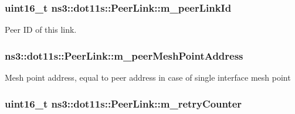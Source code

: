 \subsubsection[{\texorpdfstring{m\+\_\+peer\+Link\+Id}{m_peerLinkId}}]{\setlength{\rightskip}{0pt plus 5cm}uint16\+\_\+t ns3\+::dot11s\+::\+Peer\+Link\+::m\+\_\+peer\+Link\+Id\hspace{0.3cm}{\ttfamily [private]}}\hypertarget{classns3_1_1dot11s_1_1PeerLink_af620e2d2607904bc9b5d107aa1524038}{}\label{classns3_1_1dot11s_1_1PeerLink_af620e2d2607904bc9b5d107aa1524038}


Peer ID of this link. 

\subsubsection[{\texorpdfstring{m\+\_\+peer\+Mesh\+Point\+Address}{m_peerMeshPointAddress}}]{ ns3\+::dot11s\+::\+Peer\+Link\+::m\+\_\+peer\+Mesh\+Point\+Address\hspace{0.3cm}{\ttfamily [private]}}\hypertarget{classns3_1_1dot11s_1_1PeerLink_a610c8fd3d7f1c337f912c4a95d7c3dbc}{}\label{classns3_1_1dot11s_1_1PeerLink_a610c8fd3d7f1c337f912c4a95d7c3dbc}
Mesh point address, equal to peer address in case of single interface mesh point 
\subsubsection[{\texorpdfstring{m\+\_\+retry\+Counter}{m_retryCounter}}]{\setlength{\rightskip}{0pt plus 5cm}uint16\+\_\+t ns3\+::dot11s\+::\+Peer\+Link\+::m\+\_\+retry\+Counter\hspace{0.3cm}{\ttfamily [private]}}\hypertarget{classns3_1_1dot11s_1_1PeerLink_ad6aab8d83a3e212856351ace28b668c1}{}\label{classns3_1_1dot11s_1_1PeerLink_ad6aab8d83a3e212856351ace28b668c1}
